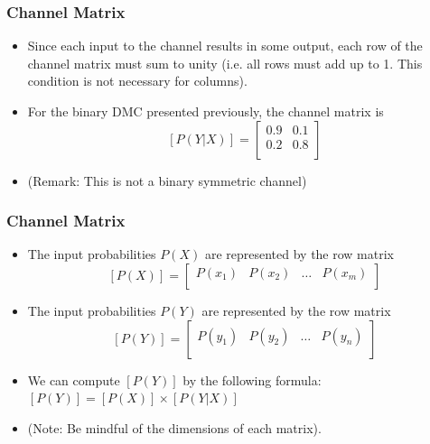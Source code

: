 \documentclass[a4]{beamer}
\begin{document}
\begin{frame}
\frametitle{Channel Matrix}
\begin{itemize}
\item Since each input to the channel results in some
output, each row of the channel matrix must sum to unity (i.e. all rows must add up to 1. This condition is not necessary for columns).
\item For the binary DMC presented previously, the channel matrix is
\[  [P(Y|X)]  = \left[ \begin{array}{cc}
0.9 & 0.1  \\
0.2 & 0.8 \\
\end{array} \right] \]
\item (Remark: This is not a binary symmetric channel)
\end{itemize}
\end{frame}


\begin{frame}
\frametitle{Channel Matrix}
\begin{itemize}
\item The input probabilities $P(X)$ are represented by the row matrix
\[  [P(X)]  = \left[ \begin{array}{cccc}
P(x_1) & P(x_2) & \ldots & P(x_m) \\
\end{array} \right] \]
\item The input probabilities $P(Y)$ are represented by the row matrix
\[  [P(Y)]  = \left[ \begin{array}{cccc}
P(y_1) & P(y_2) & \ldots & P(y_n) \\
\end{array} \right] \]
\item We can compute $[P(Y)] $ by the following formula: $[P(Y)]  = [P(X)]\times [P(Y|X)]$
\item (Note: Be mindful of the dimensions of each matrix).
\end{itemize}
\end{frame}
\end{document}
